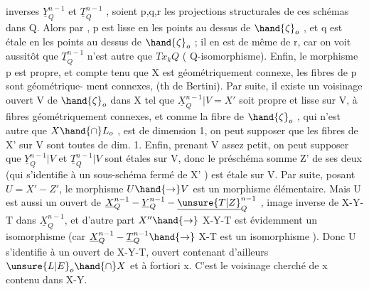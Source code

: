 
inverses $\underline{Y}^{n-1}_Q$ et $\underline{T}^{n-1}_Q$ ,  soient p,q,r les projections structurales
de ces schémas dans Q. Alors par , p est lisse en les
points au dessus de $\hand{\zeta}_o$ , et q est étale en les points au dessus de $\hand{\zeta}_o$ ;
il en est de même de r, car on voit aussitôt que $\underline{T}^{n-1}_Q$ n'est autre que
$Tx_kQ$ ( Q-isomorphisme). Enfin, le morphisme p est propre, et compte
tenu que X est géométriquement connexe, les fibres de p sont géométrique-%
ment connexes, (th de Bertini). Par suite, il existe un voisinage ouvert
V de $\hand{\zeta}_o$ dans X tel que  $\underline{X}^{n-1}_Q|V = X'$ soit propre et lisse
sur V, à fibres géométriquement connexes, et comme la fibre de $\hand{\zeta}_o$ ,
qui n'est autre que $X\hand{\cap} L_o$ , est de dimension 1, on peut supposer que les
fibres de X' sur V sont toutes de dim. 1. Enfin, prenant V assez petit,
on peut supposer que $\underline{Y}^{n-1}_Q|V$ et $\underline{T}^{n-1}_Q|V$ sont étales sur V, donc le
préschéma somme Z' de ses deux (qui s'identifie à un sous-schéma
fermé de X' ) est étale sur V. Par suite,  posant $U = X' - Z'$,
 le morphisme $U\hand{\to} V$ est un morphisme élémentaire. Mais  U est aussi
un ouvert de $\underline{X}^{n-1}_Q - \underline{Y}^{n-1}_Q - \underline{\unsure{T|Z}}^{n-1}_Q$ , image inverse de X-Y-T dans $\underline{X}^{n-1}_Q$,
et d'autre part $X''\hand{\to}$ X-Y-T est évidemment un isomorphisme (car
$\underline{X}^{n-1}_Q - \underline{T}^{n-1}_Q \hand{\to}$ X-T est un isomorphisme ). Donc U s'identifie à un ouvert
de X-Y-T, ouvert contenant d'ailleurs $\unsure{L|E}_o\hand{\cap} X$ et à fortiori x. C'est le
voisinage cherché de x contenu dans X-Y.


